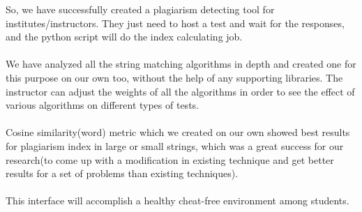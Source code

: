 So, we have successfully created a plagiarism detecting tool for institutes/instructors. They just need to host a test and wait for the responses, and the python script will do the index calculating job. \\ \\
We have analyzed all the string matching algorithms in depth and created one for this purpose on our own too, without the help of any supporting libraries. The instructor can adjust the weights of all the algorithms in order to see the effect of various algorithms on different types of tests.\\ \\
Cosine similarity(word) metric which we created on our own showed best results for plagiarism index in large or small strings, which was a great success for our research(to come up with a modification in existing technique and get better results for a set of problems than existing techniques). \\ \\
This interface will accomplish a healthy cheat-free environment among students.